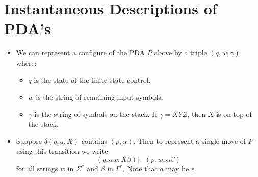 \documentclass[]{article}
\begin{document}
\section{Instantaneous Descriptions of PDA's}
  \begin{itemize}
    \item We can represent a configure of the PDA $P$ above by a triple $(q,w,
    \gamma)$ where:
      \begin{itemize}
        \item $q$ is the state of the finite-state control.
        \item $w$ is the string of remaining input symbols.
        \item $\gamma$ is the string of symbols on the stack. If $\gamma = XYZ$, 
        then $X$ is on top of the stack.
      \end{itemize}
    \item Suppose $\delta(q,a,X)$ contains $(p,\alpha)$. Then to represent a 
    single move of $P$ using this transition we write
      \[ (q,aw,X\beta) |- (p,w,\alpha\beta) \]
    for all strings $w$ in $\Sigma^*$ and $\beta$ in $\Gamma^*$. Note that $a$ 
    may be $\epsilon$.
  \end{itemize}
  
\end{document}
